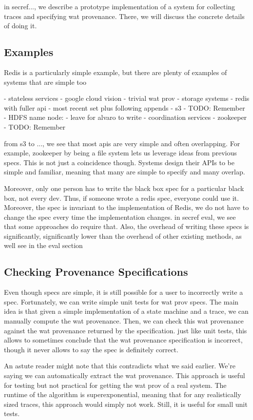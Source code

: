 in secref..., we describe a prototype implementation of a system for collecting traces and specifying wat provenance. There, we will discuss the concrete details of doing it.

\subsection{Examples}
Redis is a particularly simple example, but there are plenty of examples of systems that are simple too

- stateless services
  - google cloud vision
  - trivial wat prov
- storage systems
  - redis with fuller api
  - most recent set plus following appends
  - s3
    - TODO: Remember
  - HDFS name node:
    - leave for alvaro to write
- coordination services
  - zookeeper
    - TODO: Remember

from s3 to ..., we see that most apis are very simple and often overlapping. For example, zookeeper by being a file system lets us leverage ideas from previous specs. This is not just a coincidence though. Systems design their APIs to be simple and familiar, meaning that many are simple to specify and many overlap.

Moreover, only one person has to write the black box spec for a particular black box, not every dev. Thus, if someone wrote a redis spec, everyone could use it. Moreover, the spec is invariant to the implementation of Redis, we do not have to change the spec every time the implementation changes. in secref eval, we see that some approaches do require that. Also, the overhead of writing these specs is significantly, significantly lower than the overhead of other existing methods, as well see in the eval section

\subsection{Checking Provenance Specifications}
Even though specs are simple, it is still possible for a user to incorrectly write a spec. Fortunately, we can write simple unit tests for wat prov specs. The main idea is that given a simple implementation of a state machine and a trace, we can manually compute the wat provenance. Then, we can check this wat provenance against the wat provenance returned by the specification. just like unit tests, this allows to sometimes conclude that the wat provenance specification is incorrect, though it never allows to say the spec is definitely correct.

An astute reader might note that this contradicts what we said earlier. We're saying we can automatically extract the wat provenance. This approach is useful for testing but not practical for getting the wat prov of a real system. The runtime of the algorithm is superexponential, meaning that for any realistically sized traces, this approach would simply not work. Still, it is useful for small unit tests.

